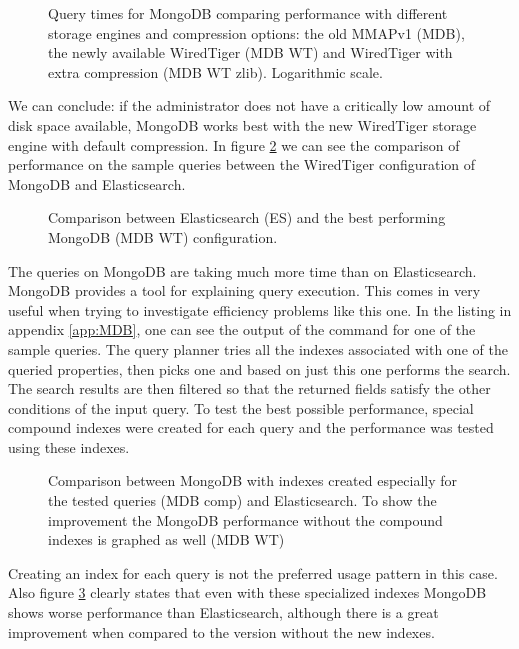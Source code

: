 \begin{figure}[h]
	\centering
	
	\caption{Query times for MongoDB comparing performance with different storage engines and compression 
	options: the old MMAPv1 (MDB), the newly available WiredTiger (MDB WT) and WiredTiger with extra compression 
	(MDB WT zlib). Logarithmic scale.}
	\label{fig:MDBcomparison}
\end{figure}

We can conclude: if the administrator does not have a critically low amount of disk space available, MongoDB
works best with the new WiredTiger storage engine with default compression. In figure \ref{fig:DBscomparison} we 
can see the comparison of performance on the sample queries between the WiredTiger configuration of MongoDB and 
Elasticsearch. 

\begin{figure}[h]
	\centering
	
	\caption{Comparison between Elasticsearch (ES) and the best performing MongoDB (MDB WT) configuration.}
	\label{fig:DBscomparison}
\end{figure}

The queries on MongoDB are taking much more time than on Elasticsearch. MongoDB provides
a tool for explaining query execution. This comes in very useful when trying to investigate efficiency problems
like this one. In the listing in appendix \ref{app:MDB}, one can see the output of the command for one of the 
sample queries. The query planner tries all the indexes associated with one of the queried properties, then 
picks one and based on just this one performs the search. The search results are then filtered so that the 
returned 
fields satisfy the other conditions of the input query. To test the best possible performance, special compound 
indexes were created for each query and the performance was tested using these indexes. 

\begin{figure}[h]
	\centering
	
	\caption{Comparison between MongoDB with indexes created especially for the tested queries (MDB comp) and 
	Elasticsearch. To show the improvement the MongoDB performance without the compound indexes is graphed as well
	(MDB WT)}
	\label{fig:MDBcompound}
\end{figure}

Creating an index for each query is not the preferred usage pattern in this case. Also figure 
\ref{fig:MDBcompound} clearly states that even with these specialized indexes MongoDB shows worse performance 
than Elasticsearch, although there is a great improvement when compared to the version without the new indexes.  

